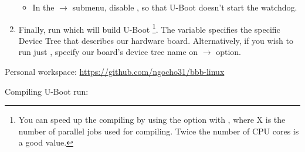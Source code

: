 \begin{enumerate}
{\begin{itemize}
  \item In the  $\rightarrow$  submenu, disable , so that U-Boot doesn't start the
    watchdog.
  \end{itemize}
  }{}

\item Finally, run
  {
  }{}
  which will build U-Boot
  \footnote{You can speed up the
  compiling by using the  option with , where X
  is the number of parallel jobs used for compiling. Twice the
  number of CPU cores is a good value.}.
  The  variable specifies the specific
  Device Tree that describes our hardware board.
  Alternatively, if you wish to run just ,
  specify our board's device tree name on
   $\rightarrow$ 
  option.
\end{enumerate}

\begin{notebox}
Personal workspace: \url{https://github.com/ngocho31/bbb-linux}

Compiling U-Boot run: 
\end{notebox}
